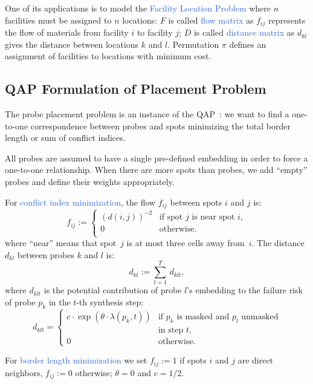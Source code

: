 \documentclass[portrait]{a0poster}
\newcommand{\myemph}[1]{\textcolor{highlight}{#1}}
\begin{document}
\begin{multicols}{3}[\aggiheader]
One of its applications is to model the \myemph{Facility Location
Problem} where $n$ facilities must be assigned to $n$ locations: $F$ is called
\myemph{flow matrix} as $f_{ij}$ represents the flow of materials
from facility $i$ to facility $j$; $D$ is called
\myemph{distance matrix} as $d_{kl}$ gives the distance between
locations $k$ and $l$. Permutation $\pi$ defines an assignment of facilities to
locations with minimum cost.

\subsection*{QAP Formulation of Placement Problem}

The probe placement problem is an instance of the
QAP~\cite{CARVALHO06}: we want to find a one-to-one correspondence between
probes and spots minimizing the total border length or sum of conflict indices.

All probes are assumed to have a single pre-defined embedding in order
to force a one-to-one relationship. When there are more spots than probes, we
add ``empty'' probes and define their weights appropriately.

For \myemph{conflict index minimization}, the flow
$f_{ij}$ between spots $i$ and $j$ is:
\[
f_{ij} := \left\{ \begin{array}{ll}
      (d(i,j))^{-2} & \mbox{if spot $j$ is near spot $i$}, \\
      0 & \mbox{otherwise}. \\
    \end{array} \right.
\]
where ``near'' means that spot~$j$ is at most three cells away from~$i$.
The distance $d_{kl}$ between probes $k$ and $l$ is:
\[ d_{kl} := \sum_{t=1}^T\, d_{klt}, \]
where $d_{klt}$ is the potential contribution of probe $l$'s embedding to the
failure risk of probe $p_k$ in the $t$-th synthesis step:
\[ d_{klt}  = \left\{ \begin{array}{ll}
    c \cdot \exp(\theta \cdot \lambda(p_k,t)) 
    & \mbox{if $p_k$ is masked and $p_l$ unmasked}\\
    & \mbox{in step $t$,} \\
    0
    & \mbox{otherwise.}
  \end{array} \right.
\]

For \myemph{border length minimization} we set
$f_{ij}:=1$ if spots $i$ and $j$ are direct neighbors, $f_{ij}:=0$ otherwise;
$\theta=0$ and $c=1/2$.



\end{multicols}
\end{document}
